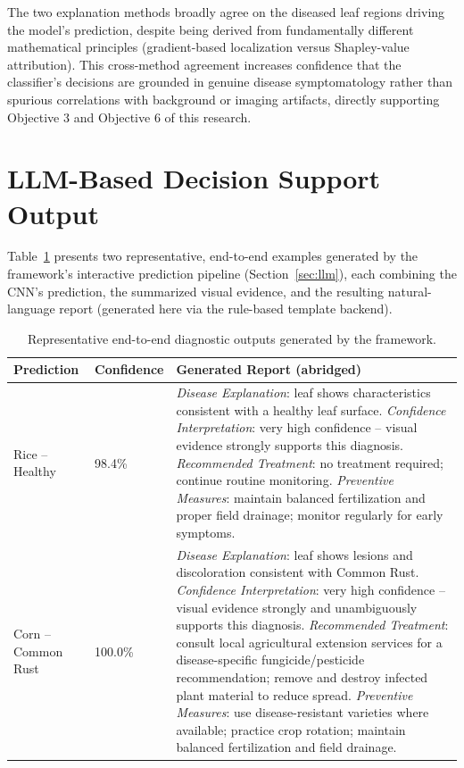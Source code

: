 \documentclass[12pt,a4paper,oneside]{report}
\begin{document}
The two explanation methods broadly agree on the diseased leaf regions driving the model's prediction, despite
being derived from fundamentally different mathematical principles (gradient-based localization versus
Shapley-value attribution). This cross-method agreement increases confidence that the classifier's decisions are
grounded in genuine disease symptomatology rather than spurious correlations with background or imaging
artifacts, directly supporting Objective 3 and Objective 6 of this research.

\section{LLM-Based Decision Support Output}
Table~\ref{tab:llm_sample} presents two representative, end-to-end examples generated by the framework's
interactive prediction pipeline (Section~\ref{sec:llm}), each combining the CNN's prediction, the summarized
visual evidence, and the resulting natural-language report (generated here via the rule-based template backend).

\begin{table}[H]
\centering
\caption{Representative end-to-end diagnostic outputs generated by the framework.}
\label{tab:llm_sample}
\small
\begin{tabular}{p{2.6cm}p{2.0cm}p{8.5cm}}
\toprule
\textbf{Prediction} & \textbf{Confidence} & \textbf{Generated Report (abridged)} \\
\midrule
Rice -- Healthy & 98.4\% &
\textit{Disease Explanation}: leaf shows characteristics consistent with a healthy leaf surface.
\textit{Confidence Interpretation}: very high confidence -- visual evidence strongly supports this diagnosis.
\textit{Recommended Treatment}: no treatment required; continue routine monitoring.
\textit{Preventive Measures}: maintain balanced fertilization and proper field drainage; monitor regularly for
early symptoms. \\
\addlinespace
Corn -- Common Rust & 100.0\% &
\textit{Disease Explanation}: leaf shows lesions and discoloration consistent with Common Rust.
\textit{Confidence Interpretation}: very high confidence -- visual evidence strongly and unambiguously supports
this diagnosis.
\textit{Recommended Treatment}: consult local agricultural extension services for a disease-specific
fungicide/pesticide recommendation; remove and destroy infected plant material to reduce spread.
\textit{Preventive Measures}: use disease-resistant varieties where available; practice crop rotation; maintain
balanced fertilization and field drainage. \\
\bottomrule
\end{tabular}
\end{table}
\end{document}
